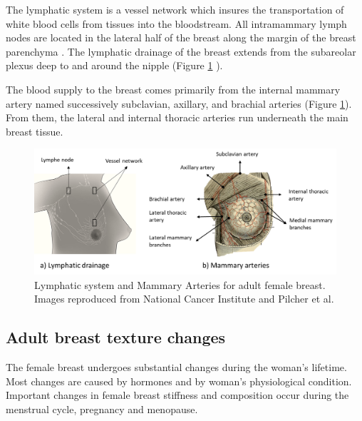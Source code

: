 The lymphatic system is a vessel network which insures the transportation of white blood cells from tissues into the bloodstream.  All intramammary lymph nodes are located in the lateral half of the breast along the margin of the breast parenchyma  \citep{kopans2007breast}.  The lymphatic drainage of the breast extends from the subareolar plexus deep to and around the nipple (Figure \ref{fig:lyphaticDrainageandArtery} ).

The blood supply to the breast comes primarily from the internal mammary artery named successively subclavian, axillary, and brachial arteries (Figure \ref{fig:lyphaticDrainageandArtery}). From them, the lateral and internal thoracic arteries run underneath the main breast tissue.

	
\begin{figure}[!h]
\centering
\includegraphics[width=\textwidth,keepaspectratio]{figures/lyphaticDrainageandArtery.PNG} 
\caption[Lymphatic system and Mammary Arteries for adult female breast. ]{Lymphatic system and Mammary Arteries for adult female breast.  Images reproduced from National Cancer Institute \citep{NCI_2012} and Pilcher et al. \citep{pilcher_breast_1917}}
\label{fig:lyphaticDrainageandArtery}
\end{figure}





\subsection{Adult breast texture changes}\label{subsection:adultbreasttexturechanges}

The female breast undergoes substantial changes during the woman's lifetime.  Most changes are caused by hormones and by woman's physiological condition. Important changes in female breast stiffness and composition occur during the menstrual cycle, pregnancy and menopause. 

